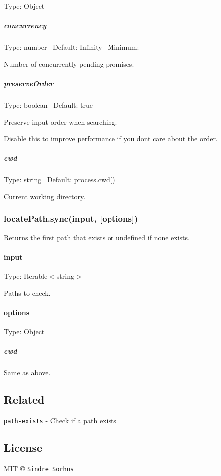 Type\+: {\ttfamily Object}

\subparagraph*{concurrency}

Type\+: {\ttfamily number}~\newline
 Default\+: {\ttfamily Infinity}~\newline
 Minimum\+: {}

Number of concurrently pending promises.

\subparagraph*{preserve\+Order}

Type\+: {\ttfamily boolean}~\newline
 Default\+: {\ttfamily true}

Preserve {\ttfamily input} order when searching.

Disable this to improve performance if you don\textquotesingle{}t care about the order.

\subparagraph*{cwd}

Type\+: {\ttfamily string}~\newline
 Default\+: {\ttfamily process.\+cwd()}

Current working directory.

\subsubsection*{locate\+Path.\+sync(input, \mbox{[}options\mbox{]})}

Returns the first path that exists or {\ttfamily undefined} if none exists.

\paragraph*{input}

Type\+: {\ttfamily Iterable$<$string$>$}

Paths to check.

\paragraph*{options}

Type\+: {\ttfamily Object}

\subparagraph*{cwd}

Same as above.

\subsection*{Related}


\begin{DoxyItemize}
\item \href{https://github.com/sindresorhus/path-exists}{\tt path-\/exists} -\/ Check if a path exists
\end{DoxyItemize}

\subsection*{License}

M\+IT © \href{https://sindresorhus.com}{\tt Sindre Sorhus} 